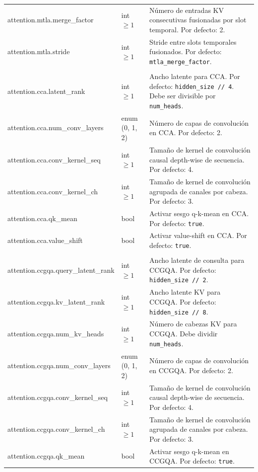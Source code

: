 \begin{longtable}{>{\ttfamily\footnotesize\raggedright\arraybackslash}p{5.6cm}>{\raggedright\arraybackslash}p{2.4cm}>{\raggedright\arraybackslash}p{6.9cm}}
attention.mtla.merge\_factor & int $\ge 1$ & Número de entradas KV consecutivas fusionadas por slot temporal. Por defecto: 2. \\
attention.mtla.stride & int $\ge 1$ & Stride entre slots temporales fusionados. Por defecto: \texttt{mtla\_merge\_factor}. \\
\midrule
\multicolumn{3}{l}{\textit{model.attention.cca.*}} \\
\midrule
attention.cca.latent\_rank & int $\ge 1$ & Ancho latente para CCA. Por defecto: \texttt{hidden\_size // 4}. Debe ser divisible por \texttt{num\_heads}. \\
attention.cca.num\_conv\_layers & enum (0, 1, 2) & Número de capas de convolución en CCA. Por defecto: 2. \\
attention.cca.conv\_kernel\_seq & int $\ge 1$ & Tamaño de kernel de convolución causal depth-wise de secuencia. Por defecto: 4. \\
attention.cca.conv\_kernel\_ch & int $\ge 1$ & Tamaño de kernel de convolución agrupada de canales por cabeza. Por defecto: 3. \\
attention.cca.qk\_mean & bool & Activar sesgo q-k-mean en CCA. Por defecto: \texttt{true}. \\
attention.cca.value\_shift & bool & Activar value-shift en CCA. Por defecto: \texttt{true}. \\
\midrule
\multicolumn{3}{l}{\textit{model.attention.ccgqa.*}} \\
\midrule
attention.ccgqa.query\_latent\_rank & int $\ge 1$ & Ancho latente de consulta para CCGQA. Por defecto: \texttt{hidden\_size // 2}. \\
attention.ccgqa.kv\_latent\_rank & int $\ge 1$ & Ancho latente KV para CCGQA. Por defecto: \texttt{hidden\_size // 8}. \\
attention.ccgqa.num\_kv\_heads & int $\ge 1$ & Número de cabezas KV para CCGQA. Debe dividir \texttt{num\_heads}. \\
attention.ccgqa.num\_conv\_layers & enum (0, 1, 2) & Número de capas de convolución en CCGQA. Por defecto: 2. \\
attention.ccgqa.conv\_kernel\_seq & int $\ge 1$ & Tamaño de kernel de convolución causal depth-wise de secuencia. Por defecto: 4. \\
attention.ccgqa.conv\_kernel\_ch & int $\ge 1$ & Tamaño de kernel de convolución agrupada de canales por cabeza. Por defecto: 3. \\
attention.ccgqa.qk\_mean & bool & Activar sesgo q-k-mean en CCGQA. Por defecto: \texttt{true}. \\

\end{longtable}
